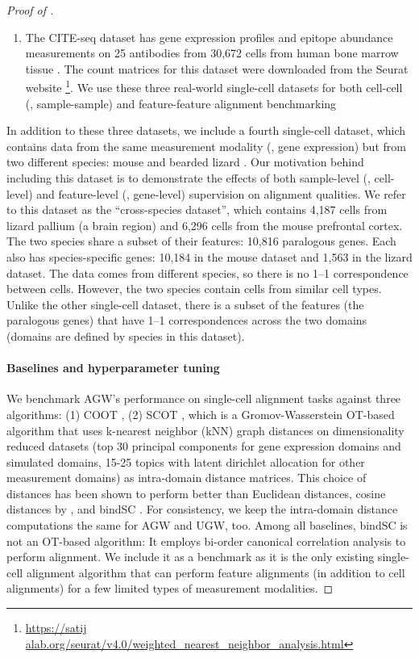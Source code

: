 \begin{proof}[Proof of ]
\begin{enumerate}
  \item The CITE-seq dataset has gene expression profiles
  and epitope abundance measurements on 25 antibodies from 30,672 cells from
  human bone marrow tissue \citep{CITEseq}. The count matrices for this dataset were downloaded
  from the Seurat website
  \footnote{\url{https://satij alab.org/seurat/v4.0/weighted_nearest_neighbor_analysis.html}}.
  We use these three real-world single-cell datasets for both cell-cell (\ie, sample-sample)
  and feature-feature alignment benchmarking
\end{enumerate}
In addition to these three datasets,
we include a fourth single-cell dataset, which contains data from the same measurement modality
(\ie, gene expression) but from two different species: mouse \citep{mouse} and
bearded lizard \citep{lizard}. Our motivation behind including this dataset is
to demonstrate the effects of both sample-level (\ie, cell-level) and
feature-level (\ie, gene-level) supervision on alignment qualities.
We refer to this dataset as the ``cross-species dataset'', which contains 4,187 cells
from lizard pallium (a brain region) and 6,296 cells from the mouse prefrontal cortex.
The two species share a subset of their features: 10,816 paralogous genes.
Each also has species-specific genes: 10,184 in the mouse dataset and 1,563 in the lizard dataset.
The data comes from different species, so there is no 1--1 correspondence between cells.
However, the two species contain cells from similar cell types.
Unlike the other single-cell dataset, there is a subset of the features (the paralogous genes)
that have 1--1 correspondences across the two domains (domains are defined by species in this dataset).

\paragraph{Baselines and hyperparameter tuning}
We benchmark AGW's performance on single-cell alignment tasks against three algorithms:
(1) COOT \citep{Redko20}, (2) SCOT \citep{Demetci20}, which is a Gromov-Wasserstein OT-based
algorithm that uses k-nearest neighbor (kNN) graph distances on dimensionality reduced datasets
(top 30 principal components for gene expression domains and simulated domains,
15-25 topics with latent dirichlet allocation for other measurement domains)
as intra-domain distance matrices. This choice of distances has been shown to perform
better than Euclidean distances, cosine distances by \citep{Demetci20}, and bindSC \citep{bindSC}.
For consistency, we keep the intra-domain distance computations the same for AGW and UGW, too.
Among all baselines, bindSC is not an OT-based algorithm: It employs bi-order canonical correlation
analysis to perform alignment. We include it as a benchmark as it is the only existing
single-cell alignment algorithm that can perform feature alignments (in addition to cell alignments)
for a few limited types of measurement modalities.


\end{proof}
